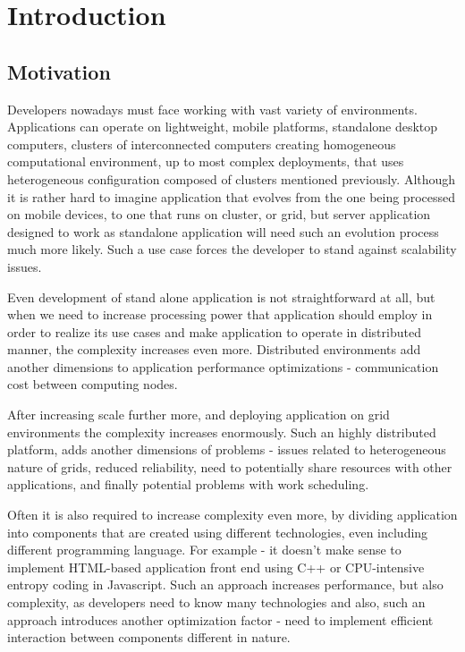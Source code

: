 %


\chapter{Introduction}
\label{cha:intro}


\section{Motivation}
\label{ch1:Motivation}

Developers nowadays must face working with vast variety of environments. Applications can operate on lightweight, mobile platforms, standalone desktop computers, clusters of interconnected computers creating homogeneous computational environment, up to most complex deployments, that uses heterogeneous configuration composed of clusters mentioned previously. Although it is rather hard to imagine application  that evolves from the one being processed on mobile devices, to one that runs on cluster, or grid, but server application designed to work as standalone application will need such an evolution process much more likely. Such a use case forces the developer to stand against scalability issues.

Even development of stand alone application is not straightforward at all, but when we need to increase processing power that application should employ in order to realize its use cases and make application to operate in distributed manner, the complexity increases even more. Distributed environments add another dimensions to application performance optimizations - communication cost between computing nodes.

After increasing scale further more, and deploying application on grid environments the complexity increases enormously. Such an highly distributed platform, adds another dimensions of problems - issues related to heterogeneous nature of grids, reduced reliability, need to potentially share resources with other applications, and finally potential problems with work scheduling.

Often it is also required to increase complexity even more, by dividing application into components that are created using different technologies, even including different programming language. For example - it doesn\rq{}t make sense to implement HTML-based application front end using C++ or CPU-intensive entropy coding in Javascript. Such an approach increases performance, but also complexity, as developers need to know many technologies and also, such an approach introduces another optimization factor - need to implement efficient interaction between components different in nature.

